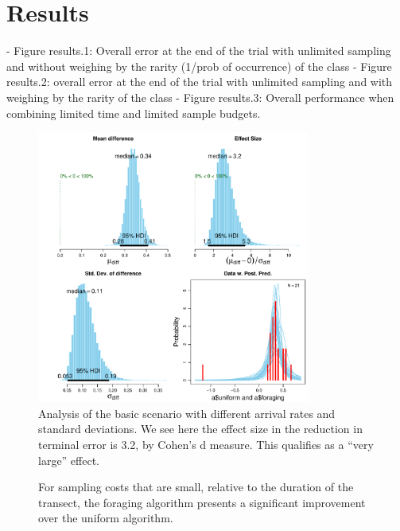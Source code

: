 \section{Results}
\label{sec:results}


- Figure results.1: Overall error at the end of the trial with unlimited sampling and without weighing by the rarity (1/prob of occurrence) of the class
- Figure results.2: overall error at the end of the trial with unlimited sampling and with weighing by the rarity of the class
- Figure results.3: Overall performance when combining limited time and limited sample budgets.


\begin{figure}[htpd]
	\centering
	\includegraphics[width=0.8\textwidth]{images/diff-diff.pdf}
	\caption{Analysis of the basic scenario with different arrival rates and standard deviations.  We see here the effect size in the reduction in terminal error is 3.2, by Cohen's d measure.  This qualifies as a ``very large'' effect.}
	\label{fig:diff-diff}
\end{figure}


\begin{figure}[htpd!]
	\centering
	\def\svgwidth{\columnwidth}
	
	\caption{For sampling costs that are small, relative to the duration of the transect, the foraging algorithm presents a significant improvement over the uniform algorithm.}
	\label{fig:err}
\end{figure}
